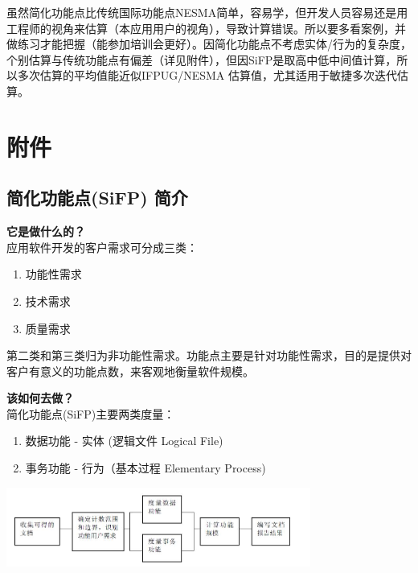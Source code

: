 虽然简化功能点比传统国际功能点NESMA简单，容易学，但开发人员容易还是用工程师的视角来估算（本应用用户的视角），导致计算错误。所以要多看案例，并做练习才能把握（能参加培训会更好）。因简化功能点不考虑实体/行为的复杂度，个别估算与传统功能点有偏差（详见附件），但因SiFP是取高中低中间值计算，所以多次估算的平均值能近似IFPUG/NESMA
估算值，尤其适用于敏捷多次迭代估算。

\hypertarget{ux9644ux4ef6}{%
\section{附件}\label{ux9644ux4ef6}}

\hypertarget{ux7b80ux5316ux529fux80fdux70b9sifp-ux7b80ux4ecb}{%
\subsection{简化功能点(SiFP)
简介}\label{ux7b80ux5316ux529fux80fdux70b9sifp-ux7b80ux4ecb}}

 \textbf{它是做什么的？} \\
应用软件开发的客户需求可分成三类：

\begin{enumerate}
\tightlist
\item
  功能性需求
\item
  技术需求
\item
  质量需求
\end{enumerate}

第二类和第三类归为非功能性需求。功能点主要是针对功能性需求，目的是提供对客户有意义的功能点数，来客观地衡量软件规模。

 \textbf{该如何去做？} \\
简化功能点(SiFP)主要两类度量：

\begin{enumerate}
\tightlist
\item
  数据功能 - 实体 (逻辑文件 Logical File)
\item
  事务功能 - 行为（基本过程 Elementary Process)
\end{enumerate}


\includegraphics[width=10cm]{功能点计数过程.jpg}

